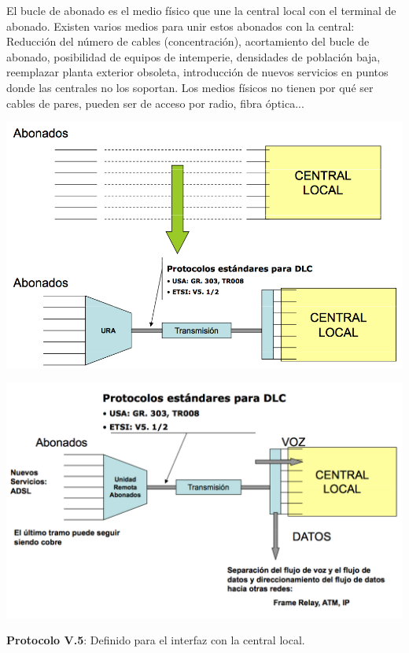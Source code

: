 \documentclass[10pt,portrait, twocolumn]{article}
\begin{document}
El bucle de abonado es el medio físico que une la central local con el terminal de abonado. Existen varios medios para unir estos abonados con la central: Reducción del número de cables (concentración), acortamiento del bucle de abonado, posibilidad de equipos de intemperie, densidades de población baja, reemplazar planta exterior obsoleta, introducción de nuevos servicios en puntos donde las centrales no los soportan. Los medios físicos no tienen por qué ser cables de pares, pueden ser de acceso por radio, fibra óptica...

	\begin{center}
		\includegraphics[scale=0.2]{images/DLC1}
	\end{center}
	
	\begin{center}
		\includegraphics[scale=0.2]{images/DLC2}
	\end{center}

\textbf{Protocolo V.5}: Definido para el interfaz con la central local.
\end{document}
